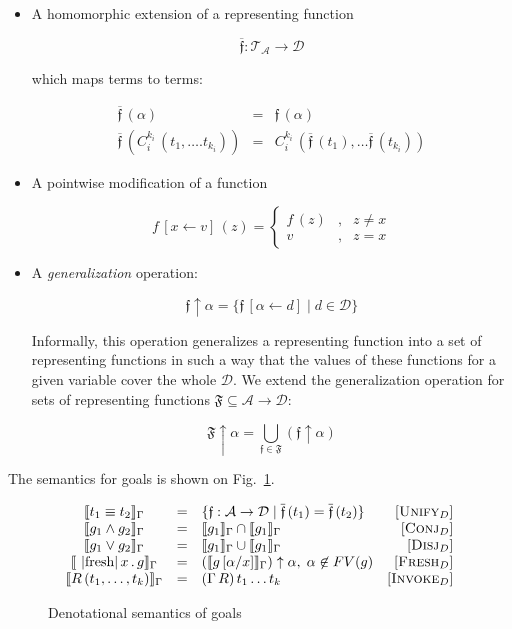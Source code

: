 \begin{itemize}
\item A homomorphic extension of a representing function 

\[
  \overline{\mathfrak{f}}:\mathcal{T_A}\to\mathcal{D}
\]

which maps terms to terms:

\[
\begin{array}{rcl}

  \overline{\mathfrak f}\,(\alpha) & = & \mathfrak f\,(\alpha)\\
  \overline{\mathfrak f}\,(C_i^{k_i}\,(t_1,\dots.t_{k_i})) & = & C_i^{k_i}\,(\overline{\mathfrak f}\,(t_1),\dots \overline{\mathfrak f}\,(t_{k_i}))
\end{array}
\]

\item A pointwise modification of a function

\[
f\,[x\gets v]\,(z)=\left\{
\begin{array}{rcl}
  f\,(z) &,& z \ne x \\
  v      &,& z = x
\end{array}
\right.
\]

\item A \emph{generalization} operation:

\[
\mathfrak{f}\uparrow\alpha = \{ \mathfrak{f}\,[\alpha\gets d] \mid d\in\mathcal D\}
\]

Informally, this operation generalizes a representing function into a set of representing functions in such a way that the
values of these functions for a given variable cover the whole $\mathcal{D}$. We extend the generalization operation for sets of
representing functions $\mathfrak{F}\subseteq\mathcal{A}\to\mathcal{D}$:

\[
  \mathfrak{F}\uparrow\alpha = \bigcup_{\mathfrak{f}\in\mathfrak{F}}(\mathfrak{f}\uparrow\alpha)
\]

\end{itemize}

The semantics for goals is shown on Fig.~\ref{denotational_semantics_of_goals}.

\begin{figure}[t]
  \[
  \begin{array}{cclr}
    \sembr{t_1\equiv t_2}_\Gamma&=&\{\mathfrak f : \mathcal{A}\to\mathcal{D}\mid \overline{\mathfrak{f}}\,(t_1)=\overline{\mathfrak{f}}\,(t_2)\}& \ruleno{Unify$_D$}\\
    \sembr{g_1\wedge g_2}_\Gamma&=&\sembr{g_1}_\Gamma\cap\sembr{g_1}_\Gamma&\ruleno{Conj$_D$}\\
    \sembr{g_1\vee g_2}_\Gamma&=&\sembr{g_1}_\Gamma\cup\sembr{g_1}_\Gamma&\ruleno{Disj$_D$}\\
    \sembr{\mbox{\lstinline|fresh|}\,x\,.\,g}_\Gamma&=&(\sembr{g\,[\alpha/x]}_\Gamma)\uparrow\alpha,\;\alpha\not\in FV(g)& \ruleno{Fresh$_D$}\\
    \sembr{R\,(t_1,\dots,t_k)}_\Gamma&=&(\Gamma\,R)\,t_1\dots t_k & \ruleno{Invoke$_D$}
  \end{array}
  \]
  \caption{Denotational semantics of goals}
  \label{denotational_semantics_of_goals}
\end{figure}

